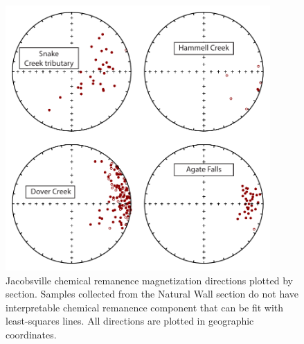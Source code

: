 \begin{figure}
\centering
\includegraphics[width=0.9\textwidth]{figure/Zhang2024a/SI_hct.pdf}
\caption[Jacobsville Formation chemical remanence directions]{Jacobsville chemical remanence magnetization directions plotted by section. Samples collected from the Natural Wall section do not have interpretable chemical remanence component that can be fit with least-squares lines. All directions are plotted in geographic coordinates.}
\label{fig:Jacobsville_CRM}
\end{figure}

